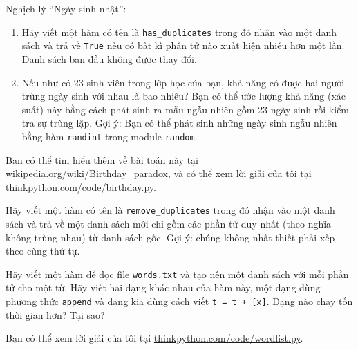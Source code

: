 \documentclass[11pt]{book}
\begin{document}
\begin{ex}
\label{duplicate}


Nghịch lý ``Ngày sinh nhật'':

\begin{enumerate}


\item Hãy viết một hàm có tên là \verb"has_duplicates" trong đó
nhận vào một danh sách và trả về {\tt True} nếu có bất kì phần tử nào
xuất hiện nhiều hơn một lần. Danh sách ban đầu không được thay đổi.

\item Nếu như có 23 sinh viên trong lớp học của bạn, khả năng có được
hai người trùng ngày sinh với nhau là bao nhiêu? Bạn có thể ước lượng
khả năng (xác suất) này bằng cách phát sinh ra mẫu ngẫu nhiên gồm
23 ngày sinh rồi kiểm tra sự trùng lặp. Gợi ý: Bạn có thể phát sinh
những ngày sinh ngẫu nhiên bằng hàm {\tt randint} trong module
{\tt random}.


\end{enumerate}

Bạn có thể tìm hiểu thêm về bài toán này tại 
\url{wikipedia.org/wiki/Birthday_paradox}, và có thể xem lời giải của tôi
tại \url{thinkpython.com/code/birthday.py}.

\end{ex}


\begin{ex}


Hãy viết một hàm có tên là \verb"remove_duplicates" trong đó nhận vào
một danh sách và trả về một danh sách mới chỉ gồm các phần tử duy nhất
(theo nghĩa không trùng nhau) từ danh sách gốc. Gợi ý: chúng không
nhất thiết phải xếp theo cùng thứ tự.
\end{ex}


\begin{ex}

Hãy viết một hàm để đọc file {\tt words.txt} và tạo nên một
danh sách với mỗi phần tử cho một từ. Hãy viết hai dạng khác
nhau của hàm này, một dạng dùng phương thức {\tt append} và
dạng kia dùng cách viết {\tt t = t + [x]}.  Dạng nào chạy
tốn thời gian hơn? Tại sao?

Bạn có thể xem lời giải của tôi tại \url{thinkpython.com/code/wordlist.py}.
\end{ex}
\end{document}
